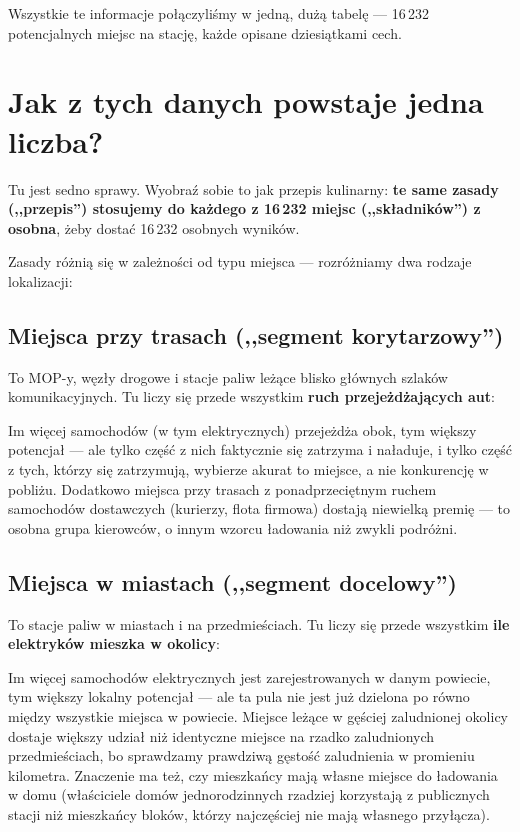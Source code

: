 \documentclass[11pt,a4paper]{article}
\begin{document}
	Wszystkie te informacje połączyliśmy w jedną, dużą tabelę --- 16\,232
	potencjalnych miejsc na stację, każde opisane dziesiątkami cech.
	
	\section{Jak z tych danych powstaje jedna liczba?}
	
	Tu jest sedno sprawy. Wyobraź sobie to jak przepis kulinarny: \textbf{te
		same zasady (,,przepis'') stosujemy do każdego z 16\,232 miejsc
		(,,składników'') z osobna}, żeby dostać 16\,232 osobnych wyników.
	
	Zasady różnią się w zależności od typu miejsca --- rozróżniamy dwa
	rodzaje lokalizacji:
	
	\subsection{Miejsca przy trasach (,,segment korytarzowy'')}
	
	To MOP-y, węzły drogowe i stacje paliw leżące blisko głównych szlaków
	komunikacyjnych. Tu liczy się przede wszystkim \textbf{ruch
		przejeżdżających aut}:
	
	\begin{infobox}
		Im więcej samochodów (w tym elektrycznych) przejeżdża obok, tym większy
		potencjał --- ale tylko część z nich faktycznie się zatrzyma i naładuje,
		i tylko część z tych, którzy się zatrzymują, wybierze akurat to miejsce,
		a nie konkurencję w pobliżu. Dodatkowo miejsca przy trasach z
		ponadprzeciętnym ruchem samochodów dostawczych (kurierzy, flota firmowa)
		dostają niewielką premię --- to osobna grupa kierowców, o innym wzorcu
		ładowania niż zwykli podróżni.
	\end{infobox}
	
	\subsection{Miejsca w miastach (,,segment docelowy'')}
	
	To stacje paliw w miastach i na przedmieściach. Tu liczy się przede
	wszystkim \textbf{ile elektryków mieszka w okolicy}:
	
	\begin{infobox}
		Im więcej samochodów elektrycznych jest zarejestrowanych w danym
		powiecie, tym większy lokalny potencjał --- ale ta pula nie jest już
		dzielona po równo między wszystkie miejsca w powiecie. Miejsce leżące w
		gęściej zaludnionej okolicy dostaje większy udział niż identyczne
		miejsce na rzadko zaludnionych przedmieściach, bo sprawdzamy prawdziwą
		gęstość zaludnienia w promieniu kilometra. Znaczenie ma też, czy
		mieszkańcy mają własne miejsce do ładowania w domu (właściciele domów
		jednorodzinnych rzadziej korzystają z publicznych stacji niż mieszkańcy
		bloków, którzy najczęściej nie mają własnego przyłącza).
	\end{infobox}
	
\end{document}
